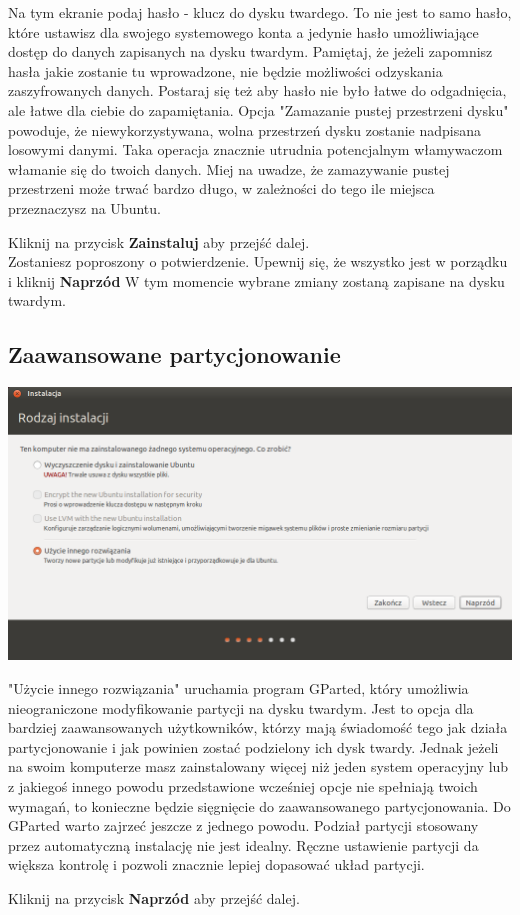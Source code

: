 Na tym ekranie podaj hasło - klucz do dysku twardego. To nie jest to samo hasło, które ustawisz dla swojego systemowego konta a jedynie hasło umożliwiające dostęp do danych zapisanych na dysku twardym. Pamiętaj, że jeżeli zapomnisz hasła jakie zostanie tu wprowadzone, nie będzie możliwości odzyskania zaszyfrowanych danych. Postaraj się też aby hasło nie było łatwe do odgadnięcia, ale łatwe dla ciebie do zapamiętania.
Opcja "Zamazanie pustej przestrzeni dysku" powoduje, że niewykorzystywana, wolna przestrzeń dysku zostanie nadpisana losowymi danymi. Taka operacja znacznie utrudnia potencjalnym włamywaczom włamanie się do twoich danych. Miej na uwadze, że zamazywanie pustej przestrzeni może trwać bardzo długo, w zależności do tego ile miejsca przeznaczysz na Ubuntu.
\begin{flushright}
Kliknij na przycisk \textbf{Zainstaluj} aby przejść dalej.\\
Zostaniesz poproszony o potwierdzenie. Upewnij się, że wszystko jest w porządku i kliknij \textbf{Naprzód}
W tym momencie wybrane zmiany zostaną zapisane na dysku twardym.\\
\end{flushright}
\clearpage
\subsection{Zaawansowane partycjonowanie}
\begin{center}
        \includegraphics[scale=0.5]{images/instalator_partycjonowanie_gparted1.png}
\end{center}
"Użycie innego rozwiązania" uruchamia program GParted, który umożliwia nieograniczone modyfikowanie partycji na dysku twardym. Jest to opcja dla bardziej zaawansowanych użytkowników, którzy mają świadomość tego jak działa partycjonowanie i jak powinien zostać podzielony ich dysk twardy. Jednak jeżeli na swoim komputerze masz zainstalowany więcej niż jeden system operacyjny lub z jakiegoś innego powodu przedstawione wcześniej opcje nie spełniają twoich wymagań, to konieczne będzie sięgnięcie do zaawansowanego partycjonowania.
Do GParted warto zajrzeć jeszcze z jednego powodu. Podział partycji stosowany przez automatyczną instalację nie jest idealny. Ręczne ustawienie partycji da większa kontrolę i pozwoli znacznie lepiej dopasować układ partycji.
\begin{flushright}
Kliknij na przycisk \textbf{Naprzód} aby przejść dalej.
\end{flushright}
\clearpage
